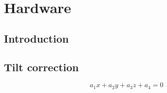 \chapter{Hardware}


\section{Introduction}



\section{Tilt correction}

\begin{equation}\label{eqn:planeeq}
a_1 x + a_2 y + a_3 z + a_4 = 0
\end{equation}